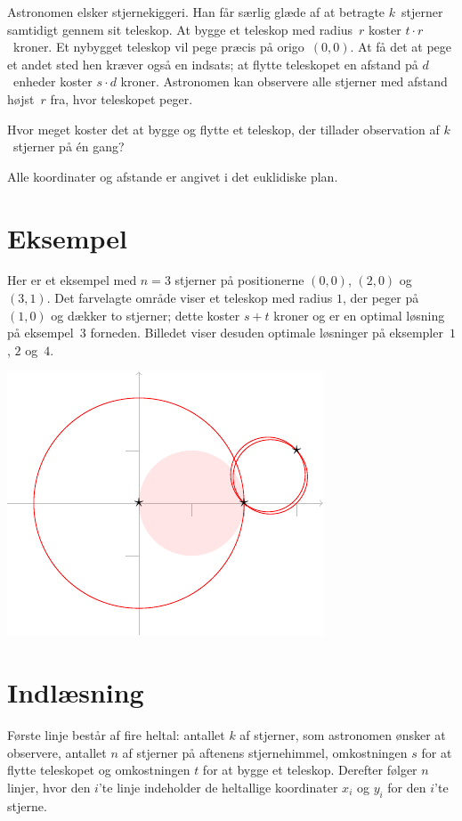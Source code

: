 
\noindent
Astronomen elsker stjernekiggeri.
Han får særlig glæde af at betragte $k$~stjerner samtidigt gennem sit teleskop.
At bygge et teleskop med radius~$r$ koster $t \cdot r$~kroner.
Et nybygget teleskop vil pege præcis på origo~$(0,0)$.
At få det at pege et andet sted hen kræver også en indsats;
at flytte teleskopet en afstand på $d$~enheder koster $s \cdot d$ kroner.
Astronomen kan observere alle stjerner med afstand højst~$r$ fra, hvor teleskopet peger.

Hvor meget koster det at bygge og flytte et teleskop, der tillader observation af $k$~stjerner på én gang?

\medskip

Alle koordinater og afstande er angivet i det euklidiske plan.

\section*{Eksempel}

Her er et eksempel med $n=3$ stjerner på positionerne $(0,0)$, $(2,0)$ og $(3,1)$.
Det farvelagte område viser et teleskop med radius $1$, der peger på $(1,0)$ og dækker to stjerner; dette koster $s + t$ kroner og er en optimal løsning på eksempel~$3$ forneden.
Billedet viser desuden optimale løsninger på eksempler~$1$, $2$ og~$4$.

\medskip
\noindent
\includegraphics[width=.3\textwidth]{img/samples.pdf}

\section*{Indlæsning}

Første linje består af fire heltal:
antallet $k$ af stjerner, som astronomen ønsker at observere,
antallet $n$ af stjerner på aftenens stjernehimmel,
omkostningen $s$ for at flytte teleskopet og
omkostningen $t$ for at bygge et teleskop.
Derefter følger $n$ linjer, hvor den $i$'te linje indeholder de heltallige koordinater $x_i$ og $y_i$ for den $i$'te stjerne.

